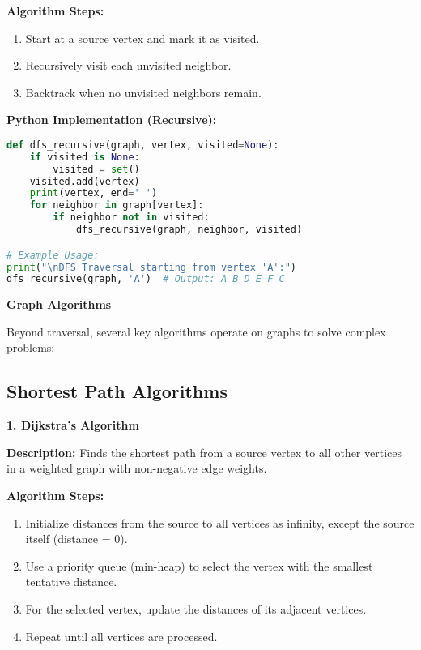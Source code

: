 \textbf{Algorithm Steps:}
\begin{enumerate}
    \item Start at a source vertex and mark it as visited.
    \item Recursively visit each unvisited neighbor.
    \item Backtrack when no unvisited neighbors remain.
\end{enumerate}

\textbf{Python Implementation (Recursive):}

\begin{lstlisting}[language=Python, xleftmargin=0.02\textwidth, xrightmargin=0.02\textwidth]
def dfs_recursive(graph, vertex, visited=None):
    if visited is None:
        visited = set()
    visited.add(vertex)
    print(vertex, end=' ')
    for neighbor in graph[vertex]:
        if neighbor not in visited:
            dfs_recursive(graph, neighbor, visited)

# Example Usage:
print("\nDFS Traversal starting from vertex 'A':")
dfs_recursive(graph, 'A')  # Output: A B D E F C 
\end{lstlisting}

\textbf{Graph Algorithms}

Beyond traversal, several key algorithms operate on graphs to solve complex problems:

\subsection{Shortest Path Algorithms}

\textbf{1. Dijkstra's Algorithm}

\textbf{Description:}  
Finds the shortest path from a source vertex to all other vertices in a weighted graph with non-negative edge weights.

\textbf{Algorithm Steps:}
\begin{enumerate}
    \item Initialize distances from the source to all vertices as infinity, except the source itself (distance = 0).
    \item Use a priority queue (min-heap) to select the vertex with the smallest tentative distance.
    \item For the selected vertex, update the distances of its adjacent vertices.
    \item Repeat until all vertices are processed.
\end{enumerate}

